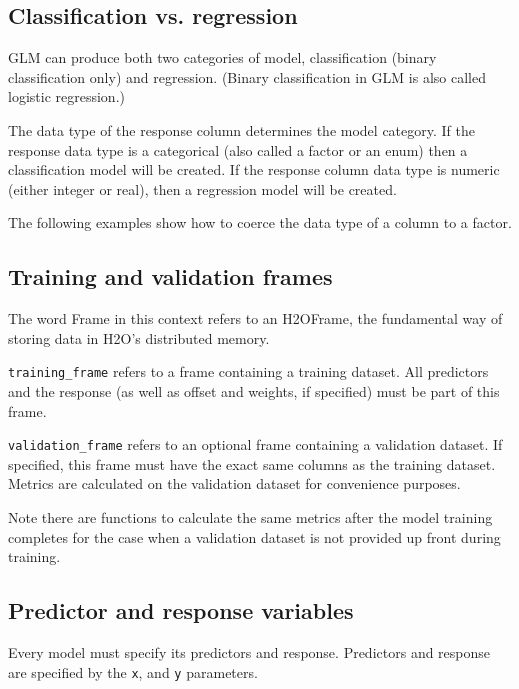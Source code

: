 \subsection{Classification vs. regression}

GLM can produce both two categories of model, classification (binary classification only) and regression.  (Binary
classification in GLM is also called logistic regression.)

The data type of the response column determines the model category.  If the response data type is a categorical
(also called a factor or an enum) then a classification model will be created.  If the response column data type is
numeric (either integer or real), then a regression model will be created.

The following examples show how to coerce the data type of a column to a factor.

\bigskip
\waterExampleInR


\waterExampleInPython


\subsection{Training and validation frames}

The word Frame in this context refers to an H2OFrame, the fundamental way of storing data in H2O's distributed memory.

\texttt{training\_frame} refers to a frame containing a training dataset.  All predictors and the response (as
well as offset and weights, if specified) must be part of this frame.

\texttt{validation\_frame} refers to an optional frame containing a validation dataset.  If specified, this 
frame must have the exact same columns as the training dataset.  Metrics are calculated on the validation dataset
for convenience purposes.

Note there are functions to calculate the same metrics after the model training completes for the case when a
validation dataset is not provided up front during training.

\subsection{Predictor and response variables}

Every model must specify its predictors and response.  Predictors and response are specified by the \texttt{x},
and \texttt{y} parameters.

